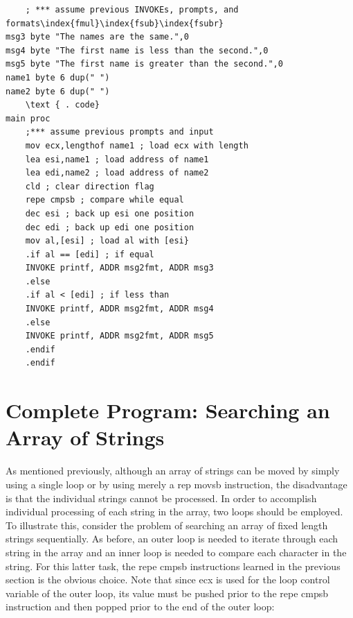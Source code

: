 \documentclass[10pt]{book}
\begin{document}
\begin{verbatim}
    ; *** assume previous INVOKEs, prompts, and formats\index{fmul}\index{fsub}\index{fsubr}
msg3 byte "The names are the same.",0
msg4 byte "The first name is less than the second.",0
msg5 byte "The first name is greater than the second.",0
name1 byte 6 dup(" ")
name2 byte 6 dup(" ")
    \text { . code}
main proc
    ;*** assume previous prompts and input
    mov ecx,lengthof name1 ; load ecx with length
    lea esi,name1 ; load address of name1
    lea edi,name2 ; load address of name2
    cld ; clear direction flag
    repe cmpsb ; compare while equal
    dec esi ; back up esi one position
    dec edi ; back up edi one position
    mov al,[esi] ; load al with [esi}
    .if al == [edi] ; if equal
    INVOKE printf, ADDR msg2fmt, ADDR msg3
    .else
    .if al < [edi] ; if less than
    INVOKE printf, ADDR msg2fmt, ADDR msg4
    .else
    INVOKE printf, ADDR msg2fmt, ADDR msg5
    .endif
    .endif
\end{verbatim}

\section{Complete Program: Searching an Array of Strings}
As mentioned previously, although an array of strings can be moved by simply using a single loop or by using merely a rep movsb instruction, the disadvantage is that the individual strings cannot be processed. In order to accomplish individual processing of each string in the array, two loops should be employed. To illustrate this, consider the problem of searching an array of fixed length strings sequentially. As before, an outer loop is needed to iterate through each string in the array and an inner loop is needed to compare each character in the string. For this latter task, the repe cmpsb instructions learned in the previous section is the obvious choice. Note that since ecx is used for the loop control variable of the outer loop, its value must be pushed prior to the repe cmpsb instruction and then popped prior to the end of the outer loop:
\end{document}
